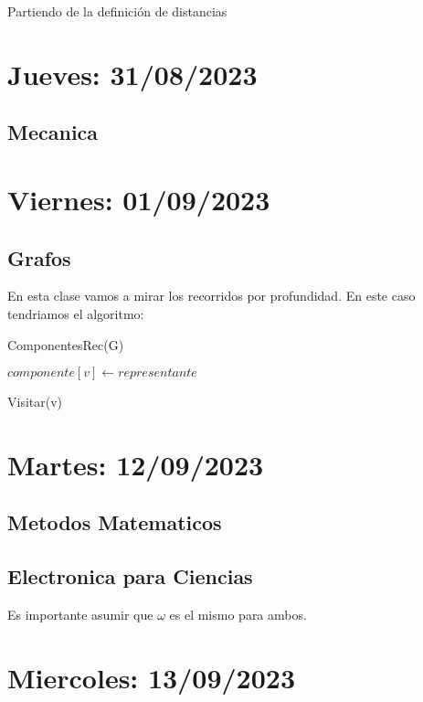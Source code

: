\documentclass{report}
\begin{document}
      Partiendo de la definición de distancias
      \chapter{Jueves: 31/08/2023}
      \section{Mecanica}
      \chapter{Viernes: 01/09/2023}
      \section{Grafos}
      En esta clase vamos a mirar los recorridos por profundidad. En este caso tendriamos el algoritmo:
      \begin{algorithm}
	\SetAlgoLined
	\caption{ComponentesRec(G)}
      \end{algorithm}

      \begin{algorithm}
	\SetAlgoLined
        $componente\left[ v \right] \leftarrow representante$ \;
	\caption{Visitar(v)}
      \end{algorithm}

      \chapter{Martes: 12/09/2023}
      \section{Metodos Matematicos}
      \section{Electronica para Ciencias}

      Es importante asumir que $\omega$ es el mismo para ambos.

      \chapter{Miercoles: 13/09/2023}
\end{document}
